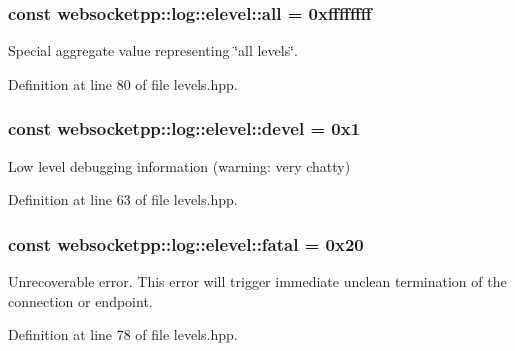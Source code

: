 \subsubsection[{all}]{ const websocketpp\+::log\+::elevel\+::all = 0xffffffff\hspace{0.3cm}{\ttfamily [static]}}\label{structwebsocketpp_1_1log_1_1elevel_a9b31ff708c221d314f9f4eb3ff2b1ad7}


Special aggregate value representing \char`\"{}all levels\char`\"{}. 



Definition at line 80 of file levels.\+hpp.

\hypertarget{structwebsocketpp_1_1log_1_1elevel_a0b1dbc650c6f2711522c096496423726}{}
\subsubsection[{devel}]{ const websocketpp\+::log\+::elevel\+::devel = 0x1\hspace{0.3cm}{\ttfamily [static]}}\label{structwebsocketpp_1_1log_1_1elevel_a0b1dbc650c6f2711522c096496423726}


Low level debugging information (warning\+: very chatty) 



Definition at line 63 of file levels.\+hpp.

\hypertarget{structwebsocketpp_1_1log_1_1elevel_aa909808e0fb142742a0ebd2dca54f517}{}
\subsubsection[{fatal}]{ const websocketpp\+::log\+::elevel\+::fatal = 0x20\hspace{0.3cm}{\ttfamily [static]}}\label{structwebsocketpp_1_1log_1_1elevel_aa909808e0fb142742a0ebd2dca54f517}
Unrecoverable error. This error will trigger immediate unclean termination of the connection or endpoint. 

Definition at line 78 of file levels.\+hpp.

\hypertarget{structwebsocketpp_1_1log_1_1elevel_a3ab47987a682f0de7b1d0df8c9c3b9d2}{}
